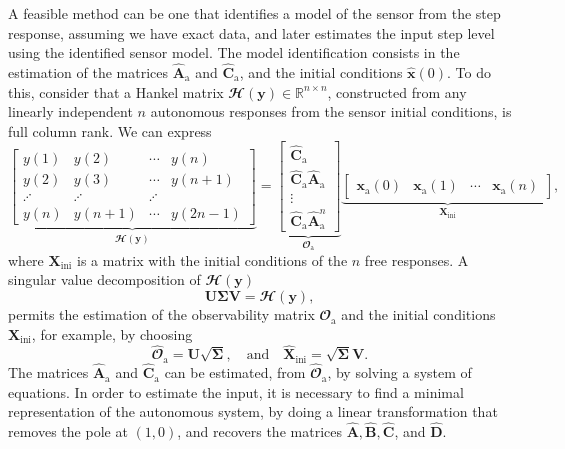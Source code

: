 
A feasible method can be one that identifies a model of the sensor from the step response, assuming we have exact data, and later estimates the input step level using the identified sensor model.
The model identification consists in the estimation of the matrices $\widehat{\mathbf{A}}_\text{a}$ and $\widehat{\mathbf{C}}_\text{a}$, and the initial conditions $\widehat{\mathbf{x}}(0)$.
To do this, consider that a Hankel matrix $\mathbfcal{H}(\mathbf{y}) \in \mathbb{R}^{n \times n}$, constructed from any linearly independent $n$ autonomous responses from the sensor initial conditions, is full column rank.
We can express 
\[ \underbrace{ \begin{bmatrix} y(1) & y(2) & \cdots & y(n) \\ y(2) & y(3) & \cdots & y(n+1) \\ \iddots & \iddots & \iddots \\ y(n) & y(n+1) & \cdots & y(2n-1) \end{bmatrix} }_{ \mathbfcal{H}(\mathbf{y}) }= \underbrace{ \begin{bmatrix} \widehat{\mathbf{C}}_\text{a} \\ \widehat{\mathbf{C}}_\text{a} \widehat{\mathbf{A}}_\text{a} \\ \vdots \\ \widehat{\mathbf{C}}_\text{a} \widehat{\mathbf{A}}_\text{a}^{n} \end{bmatrix} }_{ \mathbfcal{O}_\text{a} }  \underbrace{ \begin{bmatrix} \mathbf{x}_\text{a}(0) & \mathbf{x}_\text{a}(1) & \cdots & \mathbf{x}_\text{a}(n) \end{bmatrix} }_{ \mathbf{X}_\text{ini} } , \]
where $\mathbf{X}_\text{ini}$ is a matrix with the initial conditions of the $n$ free responses. 
A singular value decomposition of $\mathbfcal{H}(\mathbf{y})$ 
\[ \mathbf{U} \bm{\Sigma} \mathbf{V} = \mathbfcal{H}(\mathbf{y}), \]
permits the estimation of the observability matrix $\mathbfcal{O}_\text{a}$ and the initial conditions $\mathbf{X}_\text{ini}$, for example, by choosing
\[ \widehat{\mathbfcal{O}}_\text{a} = \mathbf{U} \sqrt{\bm{\Sigma}}, \quad \text{and} \quad \widehat{\mathbf{X}}_\text{ini} = \sqrt{\bm{\Sigma}} \mathbf{V} . \]
The matrices $\widehat{\mathbf{A}}_\text{a}$ and $\widehat{\mathbf{C}}_\text{a}$ can be estimated, from $\widehat{\mathbfcal{O}}_\text{a}$, by solving a system of equations.
In order to estimate the input, it is necessary to find a minimal representation of the autonomous system, by doing a linear transformation that removes the pole at $(1,0)$, and recovers the matrices $\widehat{\mathbf{A}}, \widehat{\mathbf{B}}, \widehat{\mathbf{C}}$, and $\widehat{\mathbf{D}}$.  


